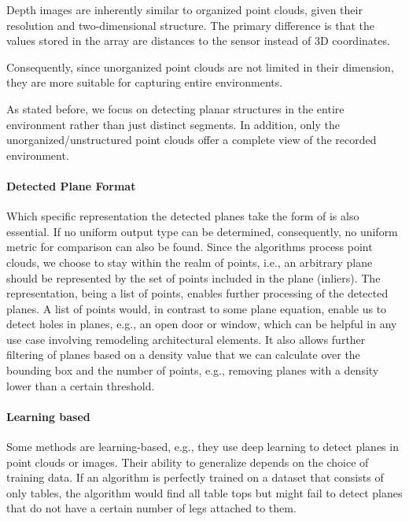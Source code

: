 \documentclass[main.tex]{subfiles}
\begin{document}
Depth images are inherently similar to organized point clouds, given their resolution and two-dimensional structure. The primary difference is that the values
stored in the array are distances to the sensor instead of 3D coordinates.

Consequently, since unorganized point clouds are not limited in their dimension, they are more suitable for capturing entire environments.

As stated before, we focus on detecting planar structures in the entire environment rather than just distinct segments.
In addition, only the unorganized/unstructured point clouds offer a complete view of the recorded environment.


\paragraph{Detected Plane Format} \label{subsec:planeformat}
Which specific representation the detected planes take the form of is also essential.
If no uniform output type can be determined, consequently, no uniform metric for comparison can also be found.
Since the algorithms process point clouds, we choose to stay within the realm of points, i.e., an arbitrary plane should be
represented by the set of points included in the plane (inliers).
The representation, being a list of points, enables further processing of the detected planes.
A list of points would, in contrast to some plane equation, enable us to detect holes in planes, e.g.,
an open door or window, which can be helpful in any use case involving remodeling architectural elements.
It also allows further filtering of planes based on a density value that we can calculate over the bounding
box and the number of points, e.g., removing planes with a density lower than a certain threshold.


\paragraph{Learning based}\label{subsec_learning_based}
Some methods are learning-based, e.g., they use deep learning to detect planes in point clouds or images.
Their ability to generalize depends on the choice of training data. If an algorithm is perfectly trained on
a dataset that consists of only tables, the algorithm would find all table tops but might fail to detect planes that do not have a certain number
of legs attached to them.
\end{document}
